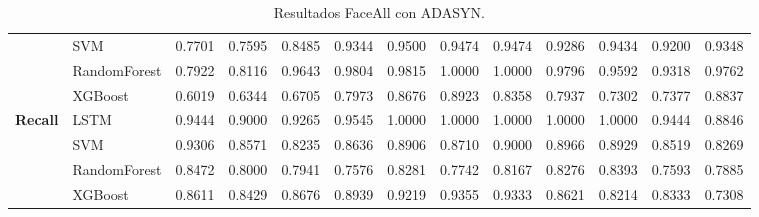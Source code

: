\begin{table}[h]
\begin{adjustbox}{max width=15cm}
\begin{tabular}{|c|l|r|r|r|r|r|r|r|r|r|r|r|}
			& SVM &  0.7701 &  0.7595 &  0.8485 &  0.9344 &  0.9500 &  0.9474 &  0.9474 &  0.9286 &  0.9434 &  0.9200 &  0.9348 \\
			& RandomForest &  0.7922 &  0.8116 &  0.9643 &  0.9804 &  0.9815 &  1.0000 &  1.0000 &  0.9796 &  0.9592 &  0.9318 &  0.9762 \\
			& XGBoost &  0.6019 &  0.6344 &  0.6705 &  0.7973 &  0.8676 &  0.8923 &  0.8358 &  0.7937 &  0.7302 &  0.7377 &  0.8837 \\
			\hline
			\textbf{Recall} & LSTM &  0.9444 &  0.9000 &  0.9265 &  0.9545 &  1.0000 &  1.0000 &  1.0000 &  1.0000 &  1.0000 &  0.9444 &  0.8846 \\
			& SVM &  0.9306 &  0.8571 &  0.8235 &  0.8636 &  0.8906 &  0.8710 &  0.9000 &  0.8966 &  0.8929 &  0.8519 &  0.8269 \\
			& RandomForest &  0.8472 &  0.8000 &  0.7941 &  0.7576 &  0.8281 &  0.7742 &  0.8167 &  0.8276 &  0.8393 &  0.7593 &  0.7885 \\
			& XGBoost &  0.8611 &  0.8429 &  0.8676 &  0.8939 &  0.9219 &  0.9355 &  0.9333 &  0.8621 &  0.8214 &  0.8333 &  0.7308 \\
			\hline
		\end{tabular}
	\end{adjustbox}
	\label{tab:faceAllADASYN}
	\caption{Resultados FaceAll con ADASYN.}
\end{table}
\newpage
